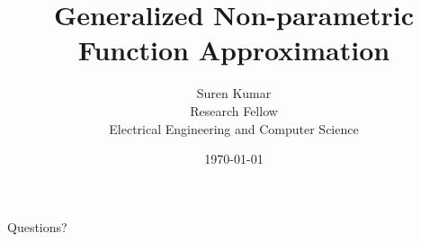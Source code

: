 \documentclass[10pt, compress]{beamer}
\title{Generalized Non-parametric Function Approximation}
\author{Suren Kumar \\ Research Fellow \\ Electrical Engineering and Computer Science}
\institute{University of Michigan, Ann Arbor \\ \url{https://github.com/surenkum/uq_gaussian_processes}}
\date{\today}
\begin{document}
\maketitle




\begin{frame}[standout]
Questions?
\end{frame}
\end{document}

